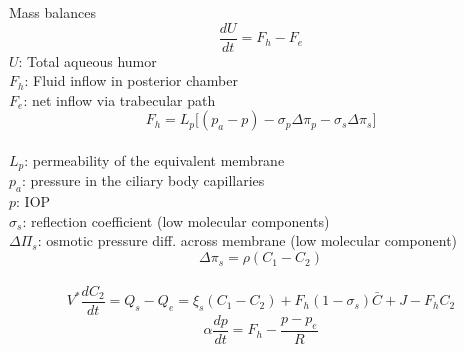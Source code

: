 \documentclass[9pt]{beamer}
\begin{document}
\begin{frame}{Mass balances}
$$ \frac{dU}{dt}=F_{h}-F_{e}$$
$U$: Total aqueous humor\\
$F_h$: Fluid inflow in posterior chamber\\
$F_e$: net inflow via trabecular path
\newline
\\

$$F_{h}= L_p \big[ (p_a-p)-\sigma_{p} \Delta\pi_{p}-\sigma_{s} \Delta\pi_{s}\big]$$\\
$L_p$: permeability of the equivalent membrane\\
$p_a$: pressure in the ciliary body capillaries\\
$p$: IOP \\
$\sigma_s$: reflection coefficient (low molecular components)\\
$\Delta \Pi_s $: osmotic pressure diff. across membrane (low molecular component)\\

$$\Delta\pi_{s}= \rho(C_1-C_{2}) $$\\

$$ V^{\ast} \frac{dC_{2}}{dt}= Q_s-Q_e=\xi_s(C_1-C_{2})+F_h (1-\sigma_s) \bar{C}+J-F_h C_2$$
$$ \alpha \frac{dp}{dt}=F_{h}-\frac{p-p_e}{R}$$


\end{frame}
\end{document}
